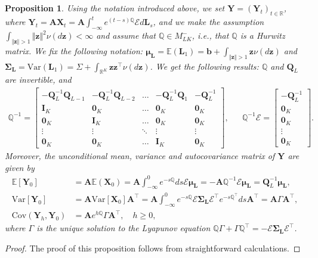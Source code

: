 \documentclass[10pt,a4paper]{amsart}
\newtheorem{prop}{Proposition}
\newcommand{\E}{\mathbb{E}}
\begin{document}
\begin{prop}\label{prop:secondorder} Using the notation introduced above, we set $\mathbf{Y}=(\mathbf{Y}_t)_{t\in \mathbb{R}}$, where $\mathbf{Y}_t=\mathbf{A}\mathbf{X}_t=\mathbf{A}\int_{-\infty}^t e^{(t-s)\mathbb{Q}}\mathcal{E}d\mathbf{L}_s$, and we make the assumption $\int_{\Vert\mathbf{z}\Vert>1}\Vert\mathbf{z}\Vert^2\nu(d\mathbf{z})<\infty$ and assume that
$\mathbb{Q}\in M_{LK}^-$, i.e., that $\mathbb{Q}$ is a Hurwitz matrix. We fix the following notation:
$\boldsymbol{\mu}_{\mathbf{L}}=\E(\mathbf{L}_1)=\mathbf{b}+\int_{\Vert\mathbf{z}\Vert>1}\mathbf{z}\nu(d\mathbf{z})$ and $\boldsymbol{\Sigma}_{\mathbf{L}}=\text{Var}(\mathbf{L}_1)=\Sigma +\int_{\mathbb{R}^K}\mathbf{z}\mathbf{z}^{\top} \nu(d\mathbf{z})$. We get the following results: $\mathbb{Q}$ and $\mathbf{Q}_L$ are invertible, and  
    \begin{align*}
  \mathbb{Q}^{-1}
 =
 \begin{bmatrix}
 -\mathbf{Q}_L^{-1}\mathbf{Q}_{L-1} & -\mathbf{Q}_L^{-1}\mathbf{Q}_{L-2} & \dots & -\mathbf{Q}_L^{-1}\mathbf{Q}_1 & -\mathbf{Q}_L^{-1}\\
 \mathbf{I}_{K} & \mathbf{0}_{K} & \dots & \mathbf{0}_{K} & \mathbf{0}_{K}\\
 \mathbf{0}_{K} & \mathbf{I}_{K} & \dots & \mathbf{0}_{K} & \mathbf{0}_{K}\\
 \vdots & \vdots & \ddots & \vdots & \vdots\\
 \mathbf{0}_{K} & \mathbf{0}_{K} & \dots & \mathbf{I}_{K} & \mathbf{0}_{K}
 \end{bmatrix},
 &&  \mathbb{Q}^{-1}\mathcal{E}=
 \begin{bmatrix}
 - \mathbf{Q}_{L}^{-1}\\
    \mathbf{0}_{K}\\
    \mathbf{0}_{K}\\
    \vdots\\
    \mathbf{0}_{K}   
\end{bmatrix}.
\end{align*}
Moreover, the unconditional mean, variance and autocovariance matrix of $\mathbf{Y}$ are given by
\begin{align*}
    \E[\mathbf{Y}_0] 
    &= \mathbf{A}\E(\mathbf{X}_0)=\mathbf{A}\int_{-\infty}^0e^{-s\mathbb{Q}} ds \mathcal{E}\boldsymbol{\mu}_{\mathbf{L}} = -\mathbf{A}\mathbb{Q}^{-1}\mathcal{E}\boldsymbol{\mu}_{\mathbf{L}}=\mathbf{Q}_L^{-1}\boldsymbol{\mu}_{\mathbf{L}},\\
    \mathrm{Var}[\mathbf{Y}_0]
     &=\mathbf{A}\mathrm{Var}[\mathbf{X}_0]\mathbf{A}^{\top}
     =\mathbf{A}\int_{-\infty}^0e^{-s\mathbb{Q}}\mathcal{E}\boldsymbol{\Sigma}_{\mathbf{L}}\mathcal{E}^{\top} e^{-s\mathbb{Q}^{\top}}ds  \mathbf{A}^{\top}   =\mathbf{A}\Gamma\mathbf{A}^{\top},\\
     \mathrm{Cov}(\mathbf{Y}_h, \mathbf{Y}_{0})
     &=\mathbf{A} e^{h\mathbb{Q}} \Gamma \mathbf{A}^{\top}, \quad h \geq 0,
\end{align*}
where $\Gamma$ is the unique solution to the Lyapunov equation $\mathbb{Q}\Gamma + \Gamma\mathbb{Q}^{\top} = -\mathcal{E}\boldsymbol{\Sigma}_{\mathbf{L}}\mathcal{E}^{\top}$. 
\end{prop}

\begin{proof} The proof of this proposition follows from straightforward calculations.
\end{proof}
\end{document}
